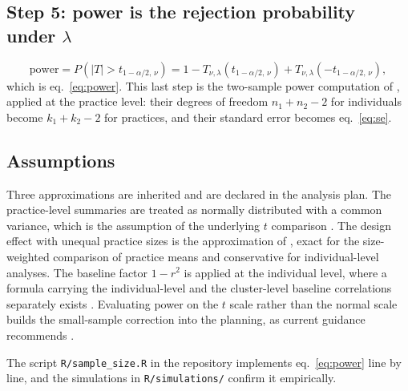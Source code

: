 \documentclass[11pt,a4paper]{article}
\begin{document}
\subsection*{Step 5: power is the rejection probability under $\lambda$}

\begin{equation}
\mathrm{power}
= P\!\left(|T| > t_{1-\alpha/2,\,\nu}\right)
= 1 - T_{\nu,\lambda}\!\left(t_{1-\alpha/2,\,\nu}\right)
    + T_{\nu,\lambda}\!\left(-t_{1-\alpha/2,\,\nu}\right),
\end{equation}
which is eq.~\eqref{eq:power}. This last step is the two-sample power
computation of \citet[section~3.2.1]{chow2018}, applied at the practice
level: their degrees of freedom $n_1 + n_2 - 2$ for individuals become
$k_1 + k_2 - 2$ for practices, and their standard error becomes
eq.~\eqref{eq:se}.

\subsection*{Assumptions}

Three approximations are inherited and are declared in the analysis plan.
The practice-level summaries are treated as normally distributed with a
common variance, which is the assumption of the underlying $t$ comparison
\citep[section~10.3.1]{hayes2017}. The design effect with unequal practice
sizes is the approximation of \citet[eq.~1]{eldridge2006}, exact for the
size-weighted comparison of practice means and conservative for
individual-level analyses. The baseline factor $1-r^2$ is applied at the
individual level, where a formula carrying the individual-level and the
cluster-level baseline correlations separately exists
\citep{teerenstra2012}. Evaluating power on the $t$ scale rather than the
normal scale builds the small-sample correction into the planning, as
current guidance recommends \citep{leyrat2018, vanbreukelen2018}.

The script \texttt{R/sample\_size.R} in the repository implements
eq.~\eqref{eq:power} line by line, and the simulations in
\texttt{R/simulations/} confirm it empirically.



\end{document}
